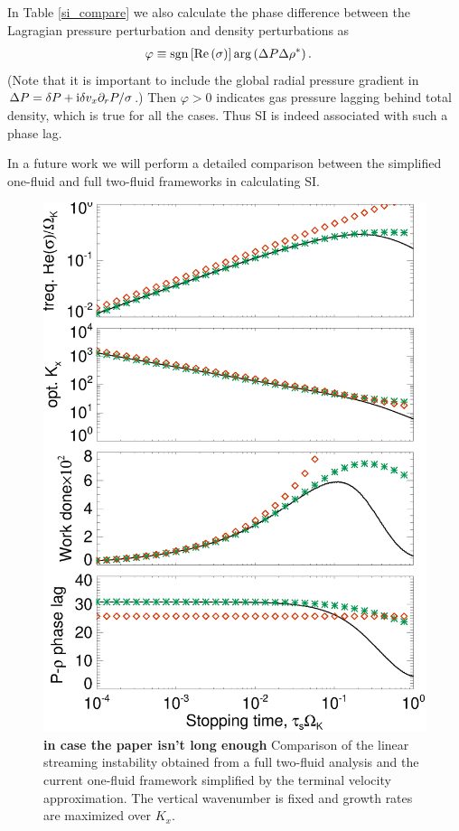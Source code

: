 In Table \ref{si_compare} we also calculate the phase difference
between the Lagragian pressure perturbation and density perturbations
as    
\begin{align*} 
\varphi&\equiv \operatorname{sgn}{\left[\operatorname{Re}{(\sigma)}\right]}\arg\left(\Delta
  P\Delta\rho^*\right).\notag 
\end{align*}
(Note that it is important to include 
the global radial pressure gradient in $\Delta P = \delta P + \mathrm{i} \delta v_x \partial_rP/\sigma$.) Then 
$\varphi > 0 $ indicates gas pressure lagging behind total density, 
which is true for all the cases. Thus SI is indeed associated with
such a phase lag.




In a future work we will perform a detailed comparison between the
simplified one-fluid and full two-fluid frameworks in calculating SI. 




\begin{figure}
\includegraphics[width=\linewidth]{figures/si_2f_1f_compare}
\caption{{\bf in case the paper isn't long enough} Comparison of the linear
streaming instability obtained from a full two-fluid analysis and the current 
one-fluid framework simplified by the terminal velocity approximation. The vertical
wavenumber is fixed and growth rates are maximized over $K_x$. 
\label{si_compare_full}}
\end{figure}


